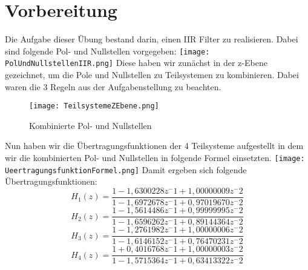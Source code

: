 
\chapter{Vorbereitung}\label{Cha:Vorb}

Die Aufgabe dieser \"Ubung bestand darin, einen IIR Filter zu realisieren. Dabei sind folgende Pol- und Nullstellen vorgegeben:
    \centering
    \texttt{[image: PolUndNullstellenIIR.png]}
Diese haben wir zun\"achst in der z-Ebene gezeichnet, um die Pole und Nullstellen zu Teilsystemen zu kombinieren. 
Dabei waren die 3 Regeln aus der Aufgabenstellung zu beachten.
\begin{figure}[H]
    \centering
    \texttt{[image: TeilsystemeZEbene.png]}
    \caption{Kombinierte Pol- und Nullstellen}
    \label{fig:PolesAndZeros}
\end{figure}     
    

  
    
    
    
    
    
    
Nun haben wir die \"Ubertragungsfunktionen der 4 Teilsysteme aufgestellt in dem wir die kombinierten Pol- und Nullstellen in folgende Formel einsetzten.
    \centering
    \texttt{[image: UeertragungsfunktionFormel.png]}
Damit ergeben sich folgende \"Ubertragungsfunktionen:
\begin{equation}
  H_1(z)=\frac{1-1,6300228z^-1+1,00000009z^-2}{1-1,6972678z^-1+0,97019670z^-2}
  \end{equation}
  \begin{equation}
  H_2(z)=\frac{1-1,5614486z^-1+0,99999995z^-2}{1-1,6596262z^-1+0,89144364z^-2}
  \end{equation}
  \begin{equation}
  H_3(z)=\frac{1-1,2761982z^-1+1,00000006z^-2}{1-1,6146152z^-1+0,76470231z^-2}
  \end{equation}
  \begin{equation}
  H_4(z)=\frac{1+0,4016768z^-1+1,00000003z^-2}{1-1,5715364z^-1+0,63413322z^-2}
\end{equation}

